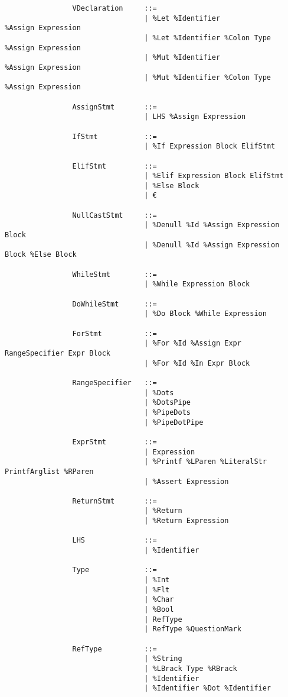 \documentclass{article}
\begin{document}
\begin{verbatim}
				VDeclaration     ::=
				                 | %Let %Identifier             %Assign Expression
				                 | %Let %Identifier %Colon Type %Assign Expression
				                 | %Mut %Identifier             %Assign Expression
				                 | %Mut %Identifier %Colon Type %Assign Expression
				                 
				AssignStmt       ::=
				                 | LHS %Assign Expression
				                 
				IfStmt           ::=
				                 | %If Expression Block ElifStmt
				                 
				ElifStmt         ::=
				                 | %Elif Expression Block ElifStmt
				                 | %Else Block
				                 | €
				                 
				NullCastStmt     ::=
				                 | %Denull %Id %Assign Expression Block
				                 | %Denull %Id %Assign Expression Block %Else Block
				                 
				WhileStmt        ::=
				                 | %While Expression Block
				
				DoWhileStmt      ::=
				                 | %Do Block %While Expression
				                 
				ForStmt          ::=
				                 | %For %Id %Assign Expr RangeSpecifier Expr Block
				                 | %For %Id %In Expr Block
				                 
				RangeSpecifier   ::=
				                 | %Dots
				                 | %DotsPipe
				                 | %PipeDots
				                 | %PipeDotPipe
				                 
				ExprStmt         ::=
				                 | Expression
				                 | %Printf %LParen %LiteralStr PrintfArglist %RParen
				                 | %Assert Expression
				                 
				ReturnStmt       ::=
				                 | %Return
				                 | %Return Expression
				                 
				LHS              ::=
				                 | %Identifier
				                 
				Type             ::=
				                 | %Int
				                 | %Flt
				                 | %Char
				                 | %Bool
				                 | RefType
				                 | RefType %QuestionMark
				                 
				RefType          ::=
				                 | %String
				                 | %LBrack Type %RBrack
				                 | %Identifier
				                 | %Identifier %Dot %Identifier
				                 

\end{verbatim}
\end{document}
